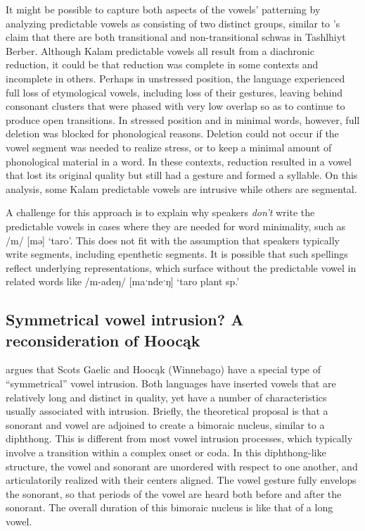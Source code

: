\documentclass[output=paper,colorlinks,citecolor=brown]{langscibook}
\begin{document}
It might be possible to capture both aspects of the vowels’ patterning by analyzing predictable vowels as consisting of two distinct groups, similar to \citet{ridouane2019story}’s claim that there are both transitional and non-transitional schwas in Tashlhiyt Berber. Although Kalam predictable vowels all result from a diachronic reduction, it could be that reduction was complete in some contexts and incomplete in others. Perhaps in unstressed position, the language experienced full loss of etymological vowels, including loss of their gestures, leaving behind consonant clusters that were phased with very low overlap so as to continue to produce open transitions. In stressed position and in minimal words, however, full deletion was blocked for phonological reasons. Deletion could not occur if the vowel segment was needed to realize stress, or to keep a minimal amount of phonological material in a word. In these contexts, reduction resulted in a vowel that lost its original quality but still had a gesture and formed a syllable. On this analysis, some Kalam predictable vowels are intrusive while others are segmental.  

A challenge for this approach is to explain why speakers \textit{don’t} write the predictable vowels in cases where they are needed for word minimality, such as /m/ [mə] ‘taro’. This does not fit with the assumption that speakers typically write segments, including epenthetic segments. It is possible that such spellings reflect underlying representations, which surface without the predictable vowel in related words like /m-adeŋ/ [maˑndeˑŋ] ‘taro plant sp.’

\subsection{Symmetrical vowel intrusion? A reconsideration of Hoocąk}

\citet{Hall:2003} argues that Scots Gaelic and Hoocąk (Winnebago) have a special type of “symmetrical” vowel intrusion. Both languages have inserted vowels that are relatively long and distinct in quality, yet have a number of characteristics usually associated with intrusion. Briefly, the theoretical proposal is that a sonorant and vowel are adjoined to create a bimoraic nucleus, similar to a diphthong. This is different from most vowel intrusion processes, which typically involve a transition within a complex onset or coda. In this diphthong-like structure, the vowel and sonorant are unordered with respect to one another, and articulatorily realized with their centers aligned. The vowel gesture fully envelops the sonorant, so that periods of the vowel are heard both before and after the sonorant. The overall duration of this bimoraic nucleus is like that of a long vowel.
\end{document}
